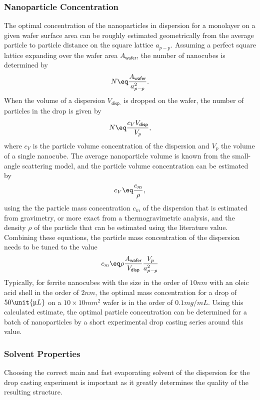 \documentclass[\main/dresen_thesis.tex]{subfiles}
\begin{document}
      \subsubsection{Nanoparticle Concentration}
        The optimal concentration of the nanoparticles in dispersion for a monolayer on a given wafer surface area can be roughly estimated geometrically from the average particle to particle distance on the square lattice $a_{p-p}$.
        Assuming a perfect square lattice expanding over the wafer area $A_{\textsf{wafer}}$, the number of nanocubes is determined by
        \begin{align}
          N \eq \frac{A_{\textsf{wafer}}}{a_{p-p}^2}.
        \end{align}
        When the volume of a dispersion $V_{\textsf{disp.}}$ is dropped on the wafer, the number of particles in the drop is given by
        \begin{align}
          N \eq \frac{c_V V_{\textsf{disp}}}{V_p},
        \end{align}
        where $c_V$ is the particle volume concentration of the dispersion and $V_p$ the volume of a single nanocube.
        The average nanoparticle volume is known from the small-angle scattering model, and the particle volume concentration can be estimated by
        \begin{align}
          c_V \eq \frac{c_m}{\rho},
        \end{align}
        using the the particle mass concentration $c_m$ of the dispersion that is estimated from gravimetry, or more exact from a thermogravimetric analysis, and the density $\rho$ of the particle that can be estimated using the literature value.
        Combining these equations, the particle mass concentration of the dispersion needs to be tuned to the value
        \begin{align}
          c_m \eq \rho \frac{A_{\textsf{wafer}}}{V_{\textsf{disp}}} \frac{V_p}{a_{p-p}^2}
        \end{align}
        Typically, for ferrite nanocubes with the size in the order of $10 \unit{nm}$ with an oleic acid shell in the order of $2 \unit{nm}$, the optimal mass concentration for a drop of $50 \unit{\text{\textmu} L}$ on a $10\times 10 \unit{mm^2}$ wafer is in the order of $0.1 \unit{mg/mL}$.
        Using this calculated estimate, the optimal particle concentration can be determined for a batch of nanoparticles by a short experimental drop casting series around this value.

      \subsubsection{Solvent Properties}
        Choosing the correct main and fast evaporating solvent of the dispersion for the drop casting experiment is important as it greatly determines the quality of the resulting structure.
\end{document}
